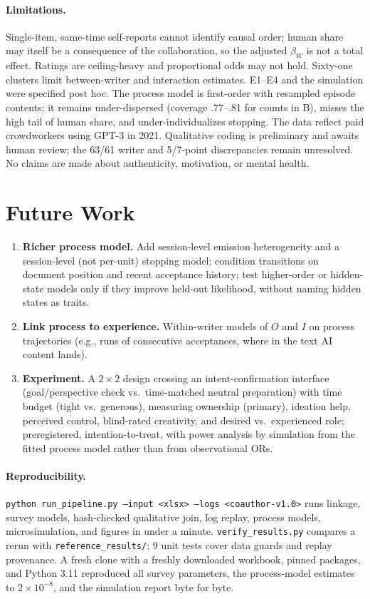 \documentclass[10pt]{article}
\begin{document}
\paragraph{Limitations.}
Single-item, same-time self-reports cannot identify causal order; human share may itself be a consequence of the collaboration, so the adjusted $\beta_W$ is not a total effect. Ratings are ceiling-heavy and proportional odds may not hold. Sixty-one clusters limit between-writer and interaction estimates. E1--E4 and the simulation were specified post hoc. The process model is first-order with resampled episode contents; it remains under-dispersed (coverage .77--.81 for counts in B), misses the high tail of human share, and under-individualizes stopping. The data reflect paid crowdworkers using GPT-3 in 2021. Qualitative coding is preliminary and awaits human review; the 63/61 writer and 5/7-point discrepancies remain unresolved. No claims are made about authenticity, motivation, or mental health.

\section{Future Work}
\begin{enumerate}
  \item \textbf{Richer process model.} Add session-level emission heterogeneity and a session-level (not per-unit) stopping model; condition transitions on document position and recent acceptance history; test higher-order or hidden-state models only if they improve held-out likelihood, without naming hidden states as traits.
  \item \textbf{Link process to experience.} Within-writer models of $O$ and $I$ on process trajectories (e.g., runs of consecutive acceptances, where in the text AI content lands).
  \item \textbf{Experiment.} A $2\times2$ design crossing an intent-confirmation interface (goal/perspective check vs.\ time-matched neutral preparation) with time budget (tight vs.\ generous), measuring ownership (primary), ideation help, perceived control, blind-rated creativity, and desired vs.\ experienced role; preregistered, intention-to-treat, with power analysis by simulation from the fitted process model rather than from observational ORs.
\end{enumerate}

\paragraph{Reproducibility.}
\texttt{python run\_pipeline.py --input <xlsx> --logs <coauthor-v1.0>} runs linkage, survey models, hash-checked qualitative join, log replay, process models, microsimulation, and figures in under a minute. \texttt{verify\_results.py} compares a rerun with \texttt{reference\_results/}; 9 unit tests cover data guards and replay provenance. A fresh clone with a freshly downloaded workbook, pinned packages, and Python 3.11 reproduced all survey parameters, the process-model estimates to $2\times10^{-8}$, and the simulation report byte for byte.
\end{document}
